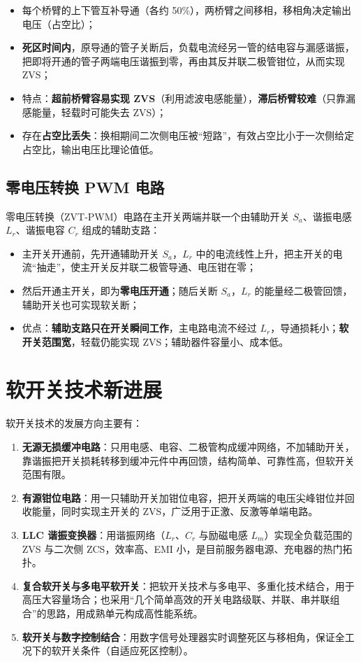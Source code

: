\begin{itemize}
  \item 每个桥臂的上下管互补导通（各约 50\%），两桥臂之间移相，移相角决定输出电压（占空比）；
  \item \textbf{死区时间内}，原导通的管子关断后，负载电流经另一管的结电容与漏感谐振，把即将开通的管子两端电压谐振到零，再由其反并联二极管钳位，从而实现 ZVS；
  \item 特点：\textbf{超前桥臂容易实现 ZVS}（利用滤波电感能量），\textbf{滞后桥臂较难}（只靠漏感能量，轻载时可能失去 ZVS）；
  \item 存在\textbf{占空比丢失}：换相期间二次侧电压被“短路”，有效占空比小于一次侧给定占空比，输出电压比理论值低。
\end{itemize}

\subsection{零电压转换 PWM 电路}

零电压转换（ZVT-PWM）电路在主开关两端并联一个由辅助开关 $S_a$、谐振电感 $L_r$、谐振电容 $C_r$ 组成的辅助支路：

\begin{itemize}
  \item 主开关开通前，先开通辅助开关 $S_a$，$L_r$ 中的电流线性上升，把主开关的电流“抽走”，使主开关反并联二极管导通、电压钳在零；
  \item 然后开通主开关，即为\textbf{零电压开通}；随后关断 $S_a$，$L_r$ 的能量经二极管回馈，辅助开关也可实现软关断；
  \item 优点：\textbf{辅助支路只在开关瞬间工作}，主电路电流不经过 $L_r$，导通损耗小；\textbf{软开关范围宽}，轻载仍能实现 ZVS；辅助器件容量小、成本低。
\end{itemize}

\section{软开关技术新进展}

软开关技术的发展方向主要有：

\begin{enumerate}
  \item \textbf{无源无损缓冲电路}：只用电感、电容、二极管构成缓冲网络，不加辅助开关，靠谐振把开关损耗转移到缓冲元件中再回馈，结构简单、可靠性高，但软开关范围有限。
  \item \textbf{有源钳位电路}：用一只辅助开关加钳位电容，把开关两端的电压尖峰钳位并回收能量，同时实现主开关的 ZVS，广泛用于正激、反激等单端电路。
  \item \textbf{LLC 谐振变换器}：用谐振网络（$L_r$、$C_r$ 与励磁电感 $L_m$）实现全负载范围的 ZVS 与二次侧 ZCS，效率高、EMI 小，是目前服务器电源、充电器的热门拓扑。
  \item \textbf{复合软开关与多电平软开关}：把软开关技术与多电平、多重化技术结合，用于高压大容量场合；也采用“几个简单高效的开关电路级联、并联、串并联组合”的思路，用成熟单元构成高性能系统。
  \item \textbf{软开关与数字控制结合}：用数字信号处理器实时调整死区与移相角，保证全工况下的软开关条件（自适应死区控制）。
\end{enumerate}

